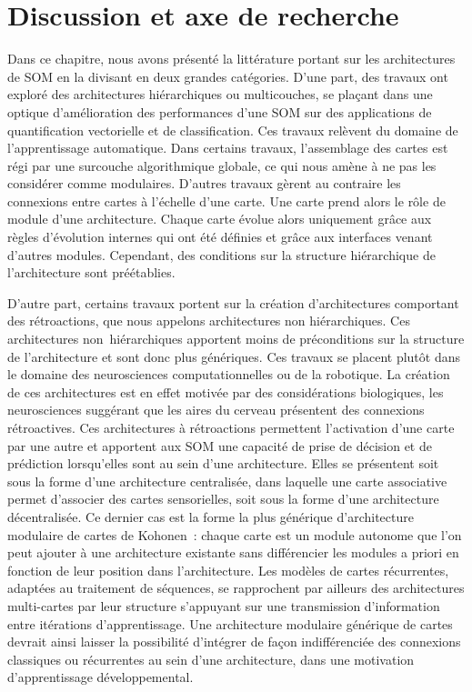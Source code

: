 \documentclass[../main]{subfiles}
\begin{document}
\section{Discussion et axe de recherche}

Dans ce chapitre, nous avons présenté la littérature portant sur les architectures de SOM en la divisant en deux grandes catégories. 
D'une part, des travaux ont exploré des architectures hiérarchiques ou multicouches, se plaçant dans une optique d'amélioration des performances d'une SOM sur des applications de quantification vectorielle et de classification. Ces travaux relèvent du domaine de l'apprentissage automatique. 
Dans certains travaux, l'assemblage des cartes est régi par une surcouche algorithmique globale, ce qui nous amène à ne pas les considérer comme modulaires. 
D'autres travaux gèrent au contraire les connexions entre cartes à l'échelle d'une carte. Une carte prend alors le rôle de module d'une architecture. Chaque carte évolue alors uniquement grâce aux règles d'évolution internes qui ont été définies et grâce aux interfaces venant d'autres modules. Cependant, des conditions sur la structure hiérarchique de l'architecture sont préétablies.

D'autre part, certains travaux portent sur la création d'architectures comportant des rétroactions, que nous appelons architectures non hiérarchiques. Ces architectures non~hiérarchiques apportent moins de préconditions sur la structure de l'architecture et sont donc plus génériques.
Ces travaux se placent plutôt dans le domaine des neurosciences computationnelles ou de la robotique. La création de ces architectures est en effet motivée par des considérations biologiques, les neurosciences suggérant que les aires du cerveau présentent des connexions rétroactives. 
Ces architectures à rétroactions permettent l'activation d'une carte par une autre et apportent aux SOM une capacité de prise de décision et de prédiction lorsqu'elles sont au sein d'une architecture. 
Elles se présentent soit sous la forme d'une architecture centralisée, dans laquelle une carte associative permet d'associer des cartes sensorielles, soit sous la forme d'une architecture décentralisée. 
Ce dernier cas est la forme la plus générique d'architecture modulaire de cartes de Kohonen~: chaque carte est un module autonome que l'on peut ajouter à une architecture existante sans différencier les modules a priori en fonction de leur position dans l'architecture.
Les modèles de cartes récurrentes, adaptées au traitement de séquences, se rapprochent par ailleurs des architectures multi-cartes par leur structure s'appuyant sur une transmission d'information entre itérations d'apprentissage.
Une architecture modulaire générique de cartes devrait ainsi laisser la possibilité d'intégrer de façon indifférenciée des connexions classiques ou récurrentes au sein d'une architecture, dans une motivation d'apprentissage développemental.
\end{document}

